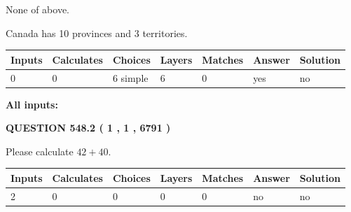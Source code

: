 \documentclass[12pt]{article}
\begin{document}
 
 None of above.
 
 
\noindent{}
 
 
Canada has 10  provinces and 3 territories.
 
 
\noindent{}
 
 
   
   
   
   
\noindent\begin{tabular}{|l|l|l|l|l|l|l|}
 \hline
Inputs & Calculates & Choices & Layers & Matches & Answer & Solution \\ \hline
 0  & 
 0  & 
 6
  simple  
  & 
 6  & 
 0  & 
  yes & 
  no 
  \\ \hline
 \end{tabular}
   
   
   
   
\noindent{}
   
   
   
   
\noindent\vspace{0.1in}\hspace{-0.08in} {\textbf{\Large{All inputs: }}}
   
   
  
\vspace{0.2in}
  
{\textbf{\Large{QUESTION
548.2 
 ( 1 , 1 , 6791 )
}}}
  
  
 
Please calculate $ %
42 +  %
40 $.
 
 
   
   
   
   
\noindent\begin{tabular}{|l|l|l|l|l|l|l|}
 \hline
Inputs & Calculates & Choices & Layers & Matches & Answer & Solution \\ \hline
 2  & 
 0  & 
 0
  & 
 0  & 
 0  & 
  no & 
  no 
  \\ \hline
 \end{tabular}
   
   
   
   
\noindent{}
   
\end{document}
